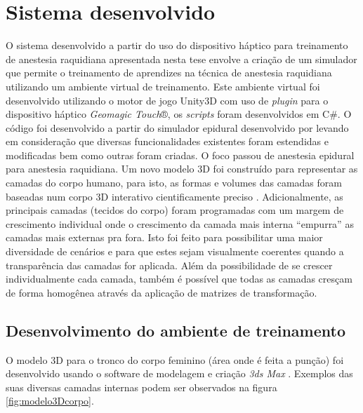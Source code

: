 \chapter{Sistema desenvolvido} \label{cap:cap4}

O sistema desenvolvido a partir do uso do dispositivo háptico para treinamento de anestesia raquidiana apresentada nesta tese envolve a criação de um simulador que permite o treinamento de aprendizes na técnica de anestesia raquidiana utilizando um ambiente virtual de treinamento.
Este ambiente virtual foi desenvolvido utilizando o motor de jogo Unity3D \cite{UnityTechnologies2020} com uso de \textit{plugin} para o dispositivo háptico \textit{Geomagic Touch}®, os \textit{scripts} foram desenvolvidos em C\#. O código foi desenvolvido a partir do simulador epidural desenvolvido por \textcite{Brazil2017thesis} levando em consideração que diversas funcionalidades existentes foram estendidas e modificadas bem como outras foram criadas. O foco passou de anestesia epidural para anestesia raquidiana. Um novo modelo 3D foi construído para representar as camadas do corpo humano, para isto, as formas e volumes das camadas foram baseadas num corpo 3D interativo cientificamente preciso \cite{BioDigitalInc2019}. Adicionalmente, as principais camadas (tecidos do corpo) foram programadas com um margem de crescimento individual onde o crescimento da camada mais interna ``empurra'' as camadas mais externas pra fora. Isto foi feito para possibilitar uma maior diversidade de cenários e para que estes sejam visualmente coerentes quando a transparência das camadas for aplicada. Além da possibilidade de se crescer individualmente cada camada, também é possível que todas as camadas cresçam de forma homogênea através da aplicação de matrizes de transformação. 

\section {Desenvolvimento do ambiente de treinamento} 

O modelo 3D para o tronco do corpo feminino (área onde é feita a punção) foi desenvolvido usando o software de modelagem e criação \textit{3ds Max} \cite{Autodesk}. Exemplos das suas diversas camadas internas podem ser observados na figura \ref{fig:modelo3Dcorpo}. 

